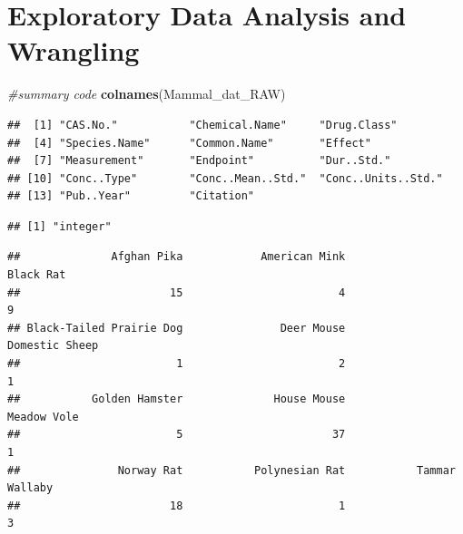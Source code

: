 \documentclass[12pt,]{article}
\newenvironment{Shaded}{\begin{snugshade}}{\end{snugshade}}
\newcommand{\KeywordTok}[1]{\textcolor[rgb]{0.13,0.29,0.53}{\textbf{#1}}}
\newcommand{\CommentTok}[1]{\textcolor[rgb]{0.56,0.35,0.01}{\textit{#1}}}
\newcommand{\OperatorTok}[1]{\textcolor[rgb]{0.81,0.36,0.00}{\textbf{#1}}}
\newcommand{\NormalTok}[1]{#1}
\begin{document}
\newpage

\section{Exploratory Data Analysis and
Wrangling}\label{exploratory-data-analysis-and-wrangling}

\begin{Shaded}
\begin{Highlighting}[]
\CommentTok{#summary code}
\KeywordTok{colnames}\NormalTok{(Mammal_dat_RAW)}
\end{Highlighting}
\end{Shaded}

\begin{verbatim}
##  [1] "CAS.No."           "Chemical.Name"     "Drug.Class"       
##  [4] "Species.Name"      "Common.Name"       "Effect"           
##  [7] "Measurement"       "Endpoint"          "Dur..Std."        
## [10] "Conc..Type"        "Conc..Mean..Std."  "Conc..Units..Std."
## [13] "Pub..Year"         "Citation"
\end{verbatim}

\begin{Shaded}
\end{Shaded}

\begin{verbatim}
## [1] "integer"
\end{verbatim}

\begin{Shaded}
\end{Shaded}

\begin{verbatim}
##              Afghan Pika            American Mink                Black Rat 
##                       15                        4                        9 
## Black-Tailed Prairie Dog               Deer Mouse           Domestic Sheep 
##                        1                        2                        1 
##           Golden Hamster              House Mouse              Meadow Vole 
##                        5                       37                        1 
##               Norway Rat           Polynesian Rat           Tammar Wallaby 
##                       18                        1                        3
\end{verbatim}
\end{document}
